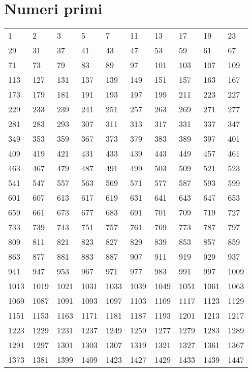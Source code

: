 
\section{Numeri primi}
\label{sec:TabellaNumeriPrrimi}
{\centering{}
	\begin{tabular}{llllllllll}
\toprule
1 &2 &3 &5 &7 &11 &13 &17 &19 &23 \\
29 &31 &37 &41 &43 &47 &53 &59 &61 &67 \\
71 &73 &79 &83 &89 &97 &101 &103 &107 &109 \\
113 &127 &131 &137 &139 &149 &151 &157 &163 &167 \\
173 &179 &181 &191 &193 &197 &199 &211 &223 &227 \\
229 &233 &239 &241 &251 &257 &263 &269 &271 &277 \\
281 &283 &293 &307 &311 &313 &317 &331 &337 &347 \\
349 &353 &359 &367 &373 &379 &383 &389 &397 &401 \\
409 &419 &421 &431 &433 &439 &443 &449 &457 &461 \\
463 &467 &479 &487 &491 &499 &503 &509 &521 &523 \\
541 &547 &557 &563 &569 &571 &577 &587 &593 &599 \\
601 &607 &613 &617 &619 &631 &641 &643 &647 &653 \\
659 &661 &673 &677 &683 &691 &701 &709 &719 &727 \\
733 &739 &743 &751 &757 &761 &769 &773 &787 &797 \\
809 &811 &821 &823 &827 &829 &839 &853 &857 &859 \\
863 &877 &881 &883 &887 &907 &911 &919 &929 &937 \\
941 &947 &953 &967 &971 &977 &983 &991 &997 &1009 \\
1013 &1019 &1021 &1031 &1033 &1039 &1049 &1051 &1061 &1063 \\
1069 &1087 &1091 &1093 &1097 &1103 &1109 &1117 &1123 &1129 \\
1151 &1153 &1163 &1171 &1181 &1187 &1193 &1201 &1213 &1217 \\
1223 &1229 &1231 &1237 &1249 &1259 &1277 &1279 &1283 &1289 \\
1291 &1297 &1301 &1303 &1307 &1319 &1321 &1327 &1361 &1367 \\
1373 &1381 &1399 &1409 &1423 &1427 &1429 &1433 &1439 &1447 \\

\end{tabular}}
